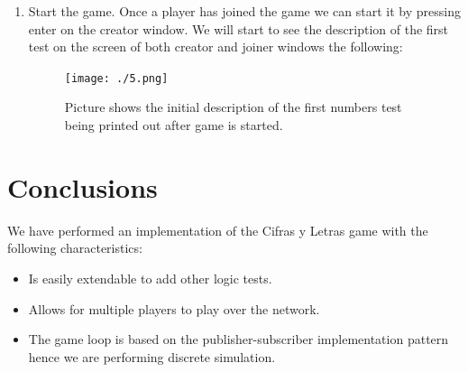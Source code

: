 \documentclass[a4paper,10pt,titlepage]{article}
\begin{document}
\begin{enumerate}
	\item Start the game. Once a player has joined the game we can start it by pressing enter on the creator window. We will start to see the description of the first test on the screen of both creator and joiner windows the following:
	\par \begin{figure}[H]
		\centerline{%
		\texttt{[image: ./5.png]}
		}
		\caption[Game starts]{Picture shows the initial description of the first numbers test being printed out after game is started.}
	\end{figure}

	
\end{enumerate}

\section{Conclusions}

\par We have performed an implementation of the Cifras y Letras game with the following characteristics:
\begin{itemize}
	\item Is easily extendable to add other logic tests.
	\item Allows for multiple players to play over the network.
	\item The game loop is based on the publisher-subscriber implementation pattern hence we are performing discrete simulation. 
\end{itemize}
\end{document}
